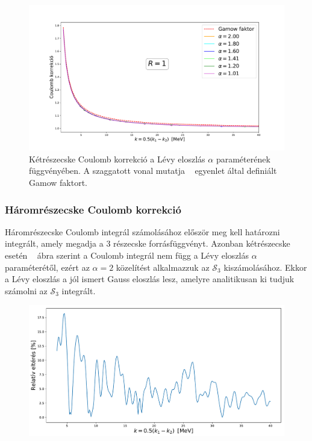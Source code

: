 \documentclass[11pt,a4paper]{article}
\numberwithin{equation}{subsection}
\numberwithin{figure}{section}
\begin{document}
\begin{figure}[H]
\centering
\includegraphics[scale=0.45]{pic/Coulomb/C2_dalpha_R1_S2correct.pdf}
\caption{Kétrészecske Coulomb korrekció a Lévy eloszlás $\alpha$ paraméterének függvényében. A szaggatott vonal mutatja ~ egyenlet által definiált Gamow faktort.}
\label{fig:CRK2dalpha}
\end{figure}

\subsubsection{Háromrészecske Coulomb korrekció}

Háromrészecske Coulomb integrál számolásához először meg kell határozni ~ integrált, amely megadja a 3 részecske forrásfüggvényt. Azonban kétrészecske esetén ~ ábra szerint a Coulomb integrál nem függ a Lévy eloszlás $\alpha$ paraméterétől, ezért az $\alpha=2$ közelítést alkalmazzuk az $\mathcal{S}_3$ kiszámolásához. Ekkor a Lévy eloszlás a jól ismert Gauss eloszlás lesz, amelyre analitikusan ki tudjuk számolni az $\mathcal{S}_3$ integrált.

\begin{figure}[H]
\centering
\includegraphics[scale=0.5]{pic/Coulomb/K3_error2.pdf}
\end{figure}
\end{document}
